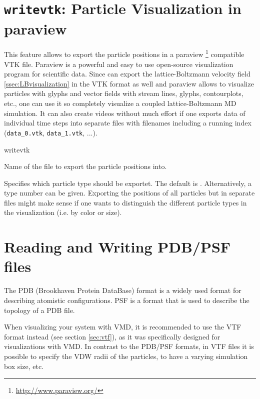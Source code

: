\section{\texttt{writevtk}: Particle Visualization in paraview}
\label{sec:writevtk}

This feature allows to export the particle positions in a paraview
\footnote{\url{http://www.paraview.org/}} compatible VTK
file. Paraview is a powerful and easy to use open-source visualization
program for scientific data. Since \es can export the
lattice-Boltzmann velocity field \ref{ssec:LBvisualization} in the VTK
format as well and paraview allows to visualize particles with glyphs
and vector fields with stream lines, glyphs, contourplots, etc., one
can use it so completely visualize a coupled lattice-Boltzmann MD
simulation. It can also create videos without much effort if one
exports data of individual time steps into separate files with
filenames including a running index (\texttt{data_0.vtk},
\texttt{data_1.vtk}, ...).

\begin{essyntax}
  writevtk  
\end{essyntax}

\begin{arguments}
\item[\var{filename}]
  Name of the file to export the particle positions into.

\item[\opt{\alt{all \asep \var{type}}}] Specifies which particle type
  should be exportet. The default is . Alternatively, a
  type number can be given. Exporting the positions of all particles
  but in separate files might make sense if one wants to distinguish
  the different particle types in the visualization (i.e. by color or
  size).
\end{arguments}

\section{Reading and Writing PDB/PSF files}
The PDB (Brookhaven Protein DataBase) format is a widely used format
for describing atomistic configurations. PSF is a format that is used
to describe the topology of a PDB file. 

When visualizing your system with VMD, it is recommended to use the
VTF format instead (see section \ref{sec:vtf}), as it was specifically
designed for visualizations with VMD. In contrast to the PDB/PSF
formats, in VTF files it is possible to specify the VDW radii of the
particles, to have a varying simulation box size, etc.

